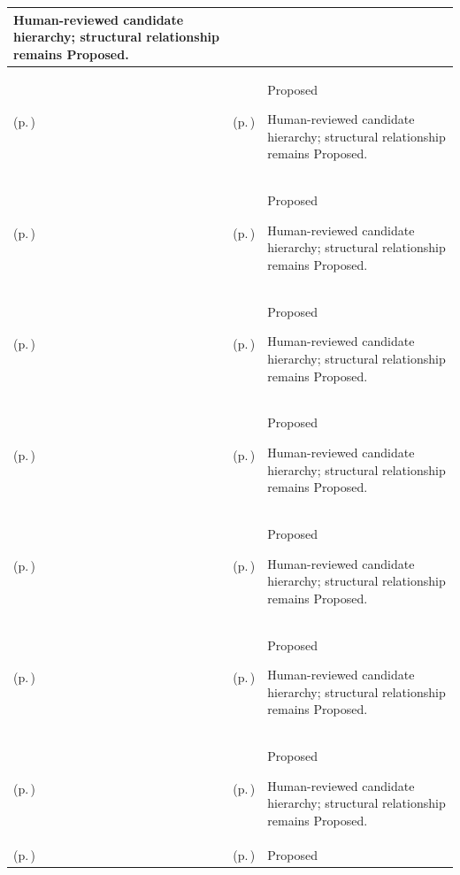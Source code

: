 \begin{longtable}{|>{\raggedright\arraybackslash}p{0.27\TableWidth}|>{\raggedright\arraybackslash}p{0.27\TableWidth}|>{\raggedright\arraybackslash}p{0.46\TableWidth}|}
Human-reviewed candidate hierarchy; structural relationship remains Proposed.\\\hline
\nameref{cap:bec-reviewed-clinical-service-dependency-management} (p.\,\pageref{cap:bec-reviewed-clinical-service-dependency-management}) & \nameref{cap:bec-allied-health} (p.\,\pageref{cap:bec-allied-health}) & Proposed

Human-reviewed candidate hierarchy; structural relationship remains Proposed.\\\hline
\nameref{cap:bec-client-centred-administration} (p.\,\pageref{cap:bec-client-centred-administration}) & \nameref{cap:bec-preventive-care} (p.\,\pageref{cap:bec-preventive-care}) & Proposed

Human-reviewed candidate hierarchy; structural relationship remains Proposed.\\\hline
\nameref{cap:bec-reviewed-clinical-service-dependency-management} (p.\,\pageref{cap:bec-reviewed-clinical-service-dependency-management}) & \nameref{cap:bec-rehabilitation} (p.\,\pageref{cap:bec-rehabilitation}) & Proposed

Human-reviewed candidate hierarchy; structural relationship remains Proposed.\\\hline
\nameref{cap:bec-care-plan-administration} (p.\,\pageref{cap:bec-care-plan-administration}) & \nameref{cap:bec-community-care} (p.\,\pageref{cap:bec-community-care}) & Proposed

Human-reviewed candidate hierarchy; structural relationship remains Proposed.\\\hline
\nameref{cap:bec-care-plan-administration} (p.\,\pageref{cap:bec-care-plan-administration}) & \nameref{cap:bec-outreach-care} (p.\,\pageref{cap:bec-outreach-care}) & Proposed

Human-reviewed candidate hierarchy; structural relationship remains Proposed.\\\hline
\nameref{cap:bec-patient-clinical-record} (p.\,\pageref{cap:bec-patient-clinical-record}) & \nameref{cap:bec-remote-virtual-care} (p.\,\pageref{cap:bec-remote-virtual-care}) & Proposed

Human-reviewed candidate hierarchy; structural relationship remains Proposed.\\\hline
\nameref{cap:bec-care-operations-coordination-enablement} (p.\,\pageref{cap:bec-care-operations-coordination-enablement}) & \nameref{cap:bec-clinic-practice-operations} (p.\,\pageref{cap:bec-clinic-practice-operations}) & Proposed

Human-reviewed candidate hierarchy; structural relationship remains Proposed.\\\hline
\nameref{cap:bec-care-operations-coordination-enablement} (p.\,\pageref{cap:bec-care-operations-coordination-enablement}) & \nameref{cap:bec-ward-operations} (p.\,\pageref{cap:bec-ward-operations}) & Proposed


\end{longtable}
